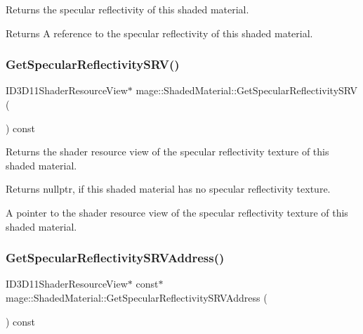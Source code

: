Returns the specular reflectivity of this shaded material.

\begin{DoxyReturn}{Returns}
A reference to the specular reflectivity of this shaded material. 
\end{DoxyReturn}
\hypertarget{structmage_1_1_shaded_material_a5ea5b4ad3100a2a625b2849ba142cdd6}{}\label{structmage_1_1_shaded_material_a5ea5b4ad3100a2a625b2849ba142cdd6} 
\subsubsection{\texorpdfstring{Get\+Specular\+Reflectivity\+S\+R\+V()}{GetSpecularReflectivitySRV()}}
{\footnotesize\ttfamily I\+D3\+D11\+Shader\+Resource\+View$\ast$ mage\+::\+Shaded\+Material\+::\+Get\+Specular\+Reflectivity\+S\+RV (\begin{DoxyParamCaption}{ }\end{DoxyParamCaption}) const\hspace{0.3cm}{\ttfamily [noexcept]}}

Returns the shader resource view of the specular reflectivity texture of this shaded material.

\begin{DoxyReturn}{Returns}
{\ttfamily nullptr}, if this shaded material has no specular reflectivity texture. 

A pointer to the shader resource view of the specular reflectivity texture of this shaded material. 
\end{DoxyReturn}
\hypertarget{structmage_1_1_shaded_material_a49e9f7f63c8bdbf471811e0a1d161340}{}\label{structmage_1_1_shaded_material_a49e9f7f63c8bdbf471811e0a1d161340} 
\subsubsection{\texorpdfstring{Get\+Specular\+Reflectivity\+S\+R\+V\+Address()}{GetSpecularReflectivitySRVAddress()}}
{\footnotesize\ttfamily I\+D3\+D11\+Shader\+Resource\+View$\ast$ const$\ast$ mage\+::\+Shaded\+Material\+::\+Get\+Specular\+Reflectivity\+S\+R\+V\+Address (\begin{DoxyParamCaption}{ }\end{DoxyParamCaption}) const\hspace{0.3cm}{\ttfamily [noexcept]}}

